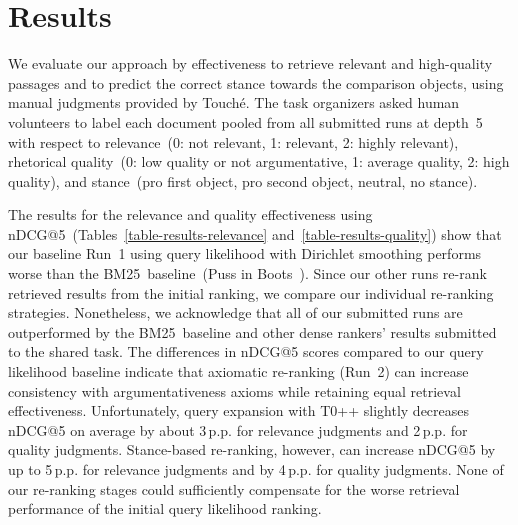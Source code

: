 \section{Results}
\label{results}

We evaluate our approach by effectiveness to retrieve relevant and high-quality passages and to predict the correct stance towards the comparison objects, using manual judgments provided by Touch{\'e}. The task organizers asked human volunteers to label each document pooled from all submitted runs at depth~5 with respect to relevance~(0: not relevant, 1: relevant, 2: highly relevant), rhetorical quality~(0: low quality or not argumentative, 1: average quality, 2: high quality), and stance~(pro first object, pro second object, neutral, no stance).

The results for the relevance and quality effectiveness using nDCG@5~(Tables~\ref{table-results-relevance} and~\ref{table-results-quality}) show that our baseline Run~1 using query likelihood with Dirichlet smoothing performs worse than the BM25~baseline~(Puss in Boots~\cite{BondarenkoFKSGBPBSWPH2022}). Since our other runs re-rank retrieved results from the initial ranking, we compare our individual re-ranking strategies. Nonetheless, we acknowledge that all of our submitted runs are outperformed by the BM25~baseline and other dense rankers' results submitted to the shared task.
The differences in nDCG@5 scores compared to our query likelihood baseline indicate that axiomatic re-ranking (Run~2) can increase consistency with argumentativeness axioms while retaining equal retrieval effectiveness. Unfortunately, query expansion with T0++ slightly decreases nDCG@5 on average by about 3\,p.p. for relevance judgments and 2\,p.p. for quality judgments. Stance-based re-ranking, however, can increase nDCG@5 by up to 5\,p.p. for relevance judgments and by 4\,p.p. for quality judgments. None of our re-ranking stages could sufficiently compensate for the worse retrieval performance of the initial query likelihood ranking.




